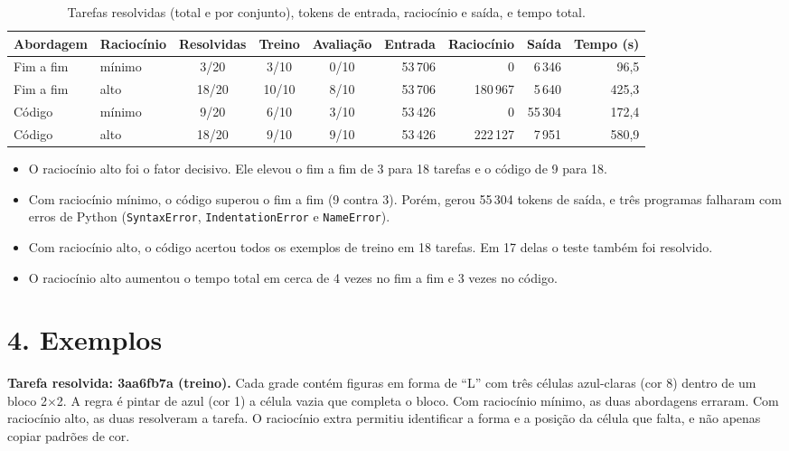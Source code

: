 \documentclass[11pt,a4paper]{article}
\begin{document}
\begin{table}[h]
\centering
\small
\setlength{\tabcolsep}{5pt}
\begin{tabular}{llcccrrrr}
\toprule
Abordagem & Raciocínio & Resolvidas & Treino & Avaliação & Entrada & Raciocínio & Saída & Tempo (s) \\
\midrule
Fim a fim & mínimo & \phantom{0}3/20 & 3/10 & 0/10 & 53\,706 & 0       & 6\,346  & 96,5  \\
Fim a fim & alto   & 18/20           & 10/10 & 8/10 & 53\,706 & 180\,967 & 5\,640  & 425,3 \\
Código    & mínimo & \phantom{0}9/20 & 6/10 & 3/10 & 53\,426 & 0       & 55\,304 & 172,4 \\
Código    & alto   & 18/20           & 9/10 & 9/10 & 53\,426 & 222\,127 & 7\,951  & 580,9 \\
\bottomrule
\end{tabular}
\caption{Tarefas resolvidas (total e por conjunto), tokens de entrada, raciocínio e saída, e tempo total.}
\label{tab:res}
\end{table}

\begin{itemize}
  \item O raciocínio alto foi o fator decisivo. Ele elevou o fim a fim de 3 para 18 tarefas e o código de 9 para 18.
  \item Com raciocínio mínimo, o código superou o fim a fim (9 contra 3). Porém, gerou 55\,304 tokens de saída,
        e três programas falharam com erros de Python (\texttt{SyntaxError}, \texttt{IndentationError} e \texttt{NameError}).
  \item Com raciocínio alto, o código acertou todos os exemplos de treino em 18 tarefas. Em 17 delas
        o teste também foi resolvido.
  \item O raciocínio alto aumentou o tempo total em cerca de 4 vezes no fim a fim e 3 vezes no código.
\end{itemize}

\section*{4. Exemplos}
\textbf{Tarefa resolvida: 3aa6fb7a (treino).} Cada grade contém figuras em forma de ``L'' com três
células azul-claras (cor 8) dentro de um bloco 2$\times$2. A regra é pintar de azul (cor 1) a célula
vazia que completa o bloco. Com raciocínio mínimo, as duas abordagens erraram. Com raciocínio alto,
as duas resolveram a tarefa. O raciocínio extra permitiu identificar a forma e a posição da célula que
falta, e não apenas copiar padrões de cor.
\end{document}
